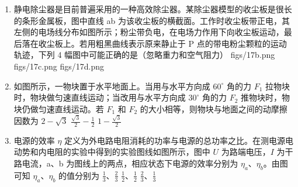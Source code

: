 \documentclass[\gkver]{gaokaozhenti}
\begin{document}
\begin{enumerate}
\item
静电除尘器是目前普遍采用的一种高效除尘器。某除尘器模型的收尘板是很长的条形金属板，图中直线 ab 为该收尘板的横截面。工作时收尘板带正电，其左侧的电场线分布如图所示；粉尘带负电，在电场力作用下向收尘板运动，最后落在收尘板上。若用粗黑曲线表示原来静止于 P 点的带电粉尘颗粒的运动轨迹，下列 4 幅图中可能正确的是（忽略重力和空气阻力）
{figs/17b.png}
{figs/17c.png}
{figs/17d.png}

\item
如图所示，一物块置于水平地面上。当用与水平方向成 $60^{\circ}$ 角的力 $F_{1}$ 拉物块时，物块做匀速直线运动；当改用与水平方向成 $30^{\circ}$ 角的力 $F_{2}$ 推物块时，物块仍做匀速直线运动。若 $F_{1}$ 和 $F_{2}$ 的大小相等，则物块与地面之间的动摩擦因数为
{$2-\sqrt{3}$}
{$\frac{\sqrt{3}}{2}-\frac{1}{2}$}
{$1-\frac{\sqrt{3}}{2}$}

\item
电源的效率 $\eta$ 定义为外电路电阻消耗的功率与电源的总功率之比。在测电源电动势和内电阻的实验中得到的实验图线如图所示，图中 $U$ 为路端电压，$I$ 为干路电流，a、b 为图线上的两点，相应状态下电源的效率分别为 $\eta_{a}$、$\eta_{b}$。由图可知 $\eta_{a}$、$\eta_{b}$ 的值分别为
{$\frac{1}{3}$、$\frac{2}{3}$}
{$\frac{1}{2}$、$\frac{1}{2}$}
{$\frac{2}{3}$、$\frac{1}{3}$}


\end{enumerate}
\end{document}
